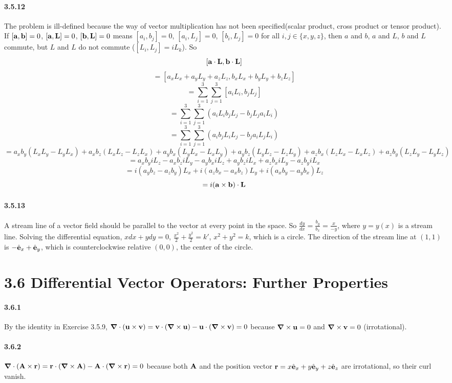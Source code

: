 \documentclass[a4paper]{article}
\begin{document}
\paragraph{3.5.12}
The problem is ill-defined because the way of vector multiplication has not been specified(scalar product, cross product or tensor product). If $[\mathbf{a},\mathbf{b}]=0$, $[\mathbf{a},\mathbf{L}]=0$, $[\mathbf{b},\mathbf{L}]=0$ means $[a_i,b_j]=0$, $[a_i,L_j]=0$, $[b_i,L_j]=0$ for all $i,j\in\{x,y,z\}$, then $a$ and $b$, $a$ and $L$, $b$ and $L$ commute, but $L$ and $L$ do not commute ($[L_i,L_j]=iL_k$). So 
\[[\mathbf{a}\cdot\mathbf{L},\mathbf{b}\cdot\mathbf{L}]\]
\[=[a_xL_x+a_yL_y+a_zL_z,b_xL_x+b_yL_y+b_zL_z]\]
\[=\sum_{i=1}^3\sum_{j=1}^3[a_iL_i,b_jL_j]\]
\[
=\sum_{i=1}^3\sum_{j=1}^3 (a_iL_ib_jL_j-b_jL_ja_iL_i)\]
\[
=\sum_{i=1}^3\sum_{j=1}^3(a_ib_jL_iL_j-b_ja_iL_jL_i)
\]
\[=
\scriptstyle a_xb_y(L_xL_y-L_yL_x)+a_xb_z(L_xL_z-L_zL_x)+a_yb_x(L_yL_x-L_xL_y)+a_yb_z(L_yL_z-L_zL_y)+a_zb_x(L_zL_x-L_xL_z)+a_zb_y(L_zL_y-L_yL_z)
\]
\[
=a_xb_yiL_z-a_xb_ziL_y-a_yb_xiL_z+a_yb_ziL_x+a_zb_xiL_y-a_zb_yiL_x
\]
\[
=i(a_yb_z-a_zb_y)L_x+i(a_zb_x-a_xb_z)L_y+i(a_xb_y-a_yb_x)L_z
\]
\[
=i(\mathbf{a}\times\mathbf{b})\cdot\mathbf{L}
\]


\paragraph{3.5.13}
A stream line of a vector field should be parallel to the vector at every point in the space. So $\frac{dy}{dx}=\frac{b_y}{b_x}=\frac{x}{-y}$, where $y=y(x)$ is a stream line. Solving  the differential equation, $xdx+ydy=0$, $\frac{x^2}{2}+\frac{y^2}{2}=k'$, $x^2+y^2=k$, which is a circle. The direction of the stream line at $(1,1)$ is $-\hat{\mathbf{e}}_x+\hat{\mathbf{e}}_y$, which is counterclockwise relative $(0,0)$, the center of the circle. 

\section*{3.6 Differential Vector Operators: Further Properties}

\paragraph{3.6.1}
By the identity in Exercise 3.5.9, $\boldsymbol{\nabla}\cdot(\mathbf{u}\times\mathbf{v})=\mathbf{v}\cdot(\boldsymbol{\nabla}\times\mathbf{u})-\mathbf{u}\cdot(\boldsymbol{\nabla}\times\mathbf{v})=0$ because $\boldsymbol{\nabla}\times\mathbf{u}=0$ and $\boldsymbol{\nabla}\times\mathbf{v}=0$ (irrotational).

\paragraph{3.6.2}
$\boldsymbol{\nabla}\cdot(\mathbf{A}\times\mathbf{r})=\mathbf{r}\cdot(\boldsymbol{\nabla}\times\mathbf{A})-\mathbf{A}\cdot(\boldsymbol{\nabla}\times\mathbf{r})=0$ because both $\mathbf{A}$ and the position vector $\mathbf{r}=x\hat{\mathbf{e}}_x+y\hat{\mathbf{e}}_y+z\hat{\mathbf{e}}_z$ are irrotational, so their curl vanish.
\end{document}
